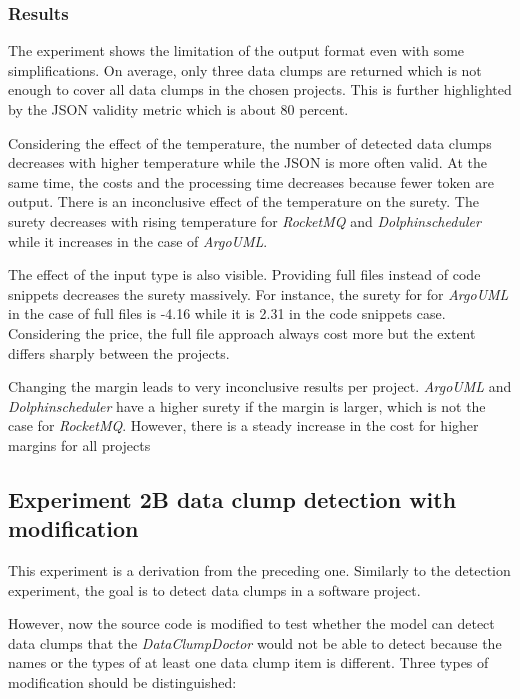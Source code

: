 \subsubsection{Results} 

The experiment shows the limitation of the output format even with some simplifications. On average, only three data clumps are returned which is not enough to cover all data clumps in the chosen projects. This is further highlighted by the \ac{JSON} validity metric which is about 80 percent. 

Considering the effect of the temperature, the number of detected data clumps decreases with higher temperature while  the \ac{JSON} is more often valid. At the same time, the costs and the processing time decreases because fewer token are output. There is an inconclusive effect of the temperature on the surety. The surety decreases with rising temperature for \textit{RocketMQ} and \textit{Dolphinscheduler} while it increases in the case of \textit{ArgoUML}. 

The effect of the input type is also visible. Providing full files instead of code snippets decreases the surety massively. For instance,  the surety for for \textit{ArgoUML} in the case of full files is -4.16 while it is 2.31 in the code snippets case. Considering the price, the full file approach always cost more but the extent differs sharply between the projects. 

Changing the margin leads to very inconclusive results per project. \textit{ArgoUML} and \textit{Dolphinscheduler} have a higher surety if the margin is larger, which is not the case for \textit{RocketMQ}. However, there is a steady increase in the cost for higher margins for all projects


\subsection{Experiment 2B data clump detection with modification}

This experiment is a derivation from the preceding one. Similarly to the detection experiment, the goal is to detect data clumps in a software project.

However, now the source code is modified to test whether the model can detect data clumps that the \textit{DataClumpDoctor} would not be able to detect because the names or the types of at least one data clump item is different. Three types of modification should be distinguished:

